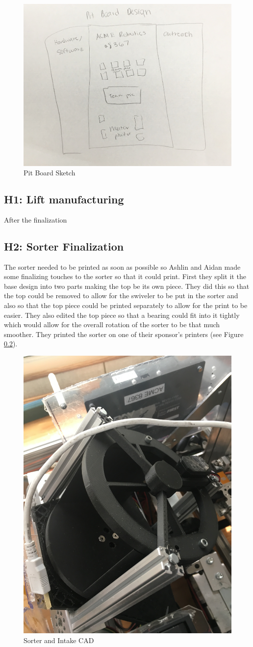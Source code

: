 \documentclass{article}
\begin{document}
\begin{figure}
    \centering
    \includegraphics[width=.6 \textwidth]{10_11-05/images/pit_board.jpg}
    \caption{Pit Board Sketch}
    \label{fig:pitboard}
\end{figure}
\subsection{H1: Lift manufacturing}

 After the finalization
 
\subsection{H2: Sorter Finalization}

The sorter needed to be printed as soon as possible so Ashlin and Aidan made some finalizing touches to the sorter so that it could print. First they split it the base design into two parts making the top be its own piece. They did this so that the top could be removed to allow for the swiveler to be put in the sorter and also so that the top piece could be printed separately to allow for the print to be easier. They also edited the top piece so that a bearing could fit into it tightly which would allow for the overall rotation of the sorter to be that much smoother. They printed the sorter on one of their sponsor's printers (see Figure \ref{}).

\begin{figure}
    \centering
    \includegraphics[width=.6 \textwidth, angle=270 ]{10_11-05/images/sorter.JPG}
    \caption{Sorter and Intake CAD}
    \label{fig:Intake CAD}
\end{figure}
\end{document}
